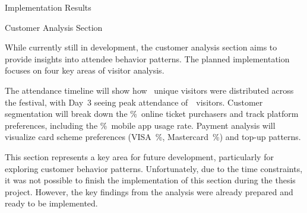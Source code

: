 \begin{section}{Implementation Results}
	\begin{subsection}{Customer Analysis Section}
		\label{subsec:implementation-results-structure-customer}

		While currently still in development, the customer analysis section aims to provide insights into attendee behavior patterns.
		The planned implementation focuses on four key areas of visitor analysis.


		The attendance timeline will show how ~unique visitors were distributed across the festival, with Day~3 seeing peak attendance of~~visitors.
		Customer segmentation will break down the \%~online ticket purchasers and track platform preferences, including the \%~mobile app usage rate.
		Payment analysis will visualize card scheme preferences (VISA~\%, Mastercard~\%) and top-up patterns.

		This section represents a key area for future development, particularly for exploring customer behavior patterns.
		Unfortunately, due to the time constraints, it was not possible to finish the implementation of this section during the thesis project.
		However, the key findings from the analysis were already prepared and ready to be implemented.
	\end{subsection}
\end{section}


